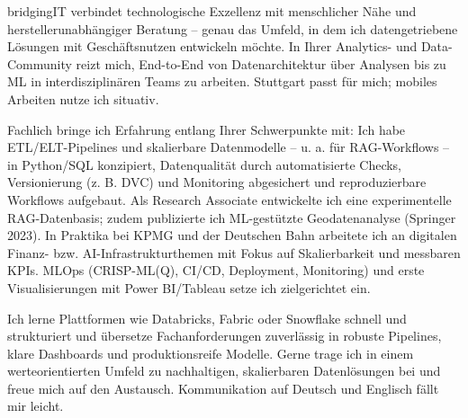bridgingIT verbindet technologische Exzellenz mit menschlicher Nähe und herstellerunabhängiger Beratung – genau das Umfeld, in dem ich datengetriebene Lösungen mit Geschäftsnutzen entwickeln möchte. In Ihrer Analytics- und Data-Community reizt mich, End-to-End von Datenarchitektur über Analysen bis zu ML in interdisziplinären Teams zu arbeiten. Stuttgart passt für mich; mobiles Arbeiten nutze ich situativ.

Fachlich bringe ich Erfahrung entlang Ihrer Schwerpunkte mit: Ich habe ETL/ELT-Pipelines und skalierbare Datenmodelle – u. a. für RAG-Workflows – in Python/SQL konzipiert, Datenqualität durch automatisierte Checks, Versionierung (z. B. DVC) und Monitoring abgesichert und reproduzierbare Workflows aufgebaut. Als Research Associate entwickelte ich eine experimentelle RAG-Datenbasis; zudem publizierte ich ML-gestützte Geodatenanalyse (Springer 2023). In Praktika bei KPMG und der Deutschen Bahn arbeitete ich an digitalen Finanz- bzw. AI-Infrastrukturthemen mit Fokus auf Skalierbarkeit und messbaren KPIs. MLOps (CRISP-ML(Q), CI/CD, Deployment, Monitoring) und erste Visualisierungen mit Power BI/Tableau setze ich zielgerichtet ein.

Ich lerne Plattformen wie Databricks, Fabric oder Snowflake schnell und strukturiert und übersetze Fachanforderungen zuverlässig in robuste Pipelines, klare Dashboards und produktionsreife Modelle. Gerne trage ich in einem werteorientierten Umfeld zu nachhaltigen, skalierbaren Datenlösungen bei und freue mich auf den Austausch. Kommunikation auf Deutsch und Englisch fällt mir leicht.